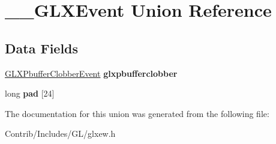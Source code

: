 \hypertarget{union_____g_l_x_event}{}\section{\+\_\+\+\_\+\+G\+L\+X\+Event Union Reference}
\label{union_____g_l_x_event}
\subsection*{Data Fields}
\begin{DoxyCompactItemize}
\item 
\hyperlink{struct_g_l_x_pbuffer_clobber_event}{G\+L\+X\+Pbuffer\+Clobber\+Event} {\bfseries glxpbufferclobber}\hypertarget{union_____g_l_x_event_a4fc998c95b3a8d7ddb323dcd2c5003d8}{}\label{union_____g_l_x_event_a4fc998c95b3a8d7ddb323dcd2c5003d8}

\item 
long {\bfseries pad} \mbox{[}24\mbox{]}\hypertarget{union_____g_l_x_event_aee423fd23351ca3fce249e587d376cda}{}\label{union_____g_l_x_event_aee423fd23351ca3fce249e587d376cda}

\end{DoxyCompactItemize}


The documentation for this union was generated from the following file\+:\begin{DoxyCompactItemize}
\item 
Contrib/\+Includes/\+G\+L/glxew.\+h\end{DoxyCompactItemize}
